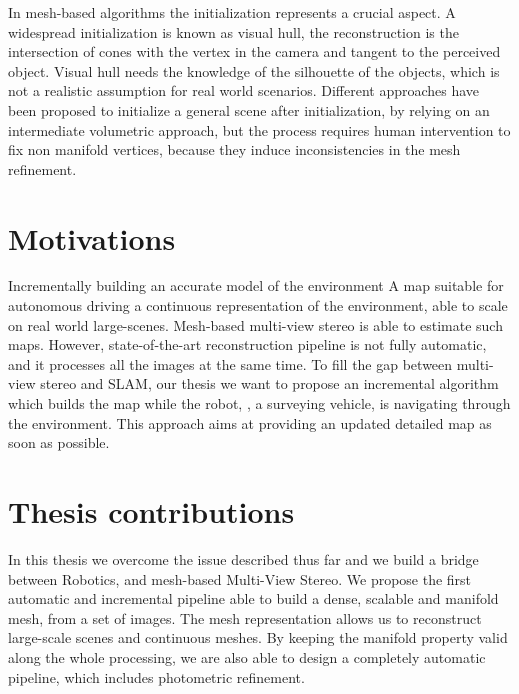 In mesh-based algorithms the initialization represents a crucial aspect.
A widespread initialization is known as visual hull, the reconstruction is the intersection of cones with the vertex in the camera and tangent to the perceived object.
Visual hull needs the knowledge of the silhouette of the objects, which is not a realistic assumption for real world scenarios.
Different approaches have been proposed to initialize a general scene after initialization, by relying on an intermediate volumetric approach, but the process requires human intervention to fix non manifold vertices, because they induce inconsistencies in the mesh refinement.

\section{Motivations}
Incrementally building an accurate model of the environment 
A map suitable for autonomous driving  a continuous representation of the environment, able to scale on real world large-scenes.
Mesh-based multi-view stereo is able to estimate such maps. 
However, state-of-the-art reconstruction pipeline is not fully automatic, and it processes all the images at the same time. 
To fill the gap between multi-view stereo and SLAM, our thesis we want to propose an incremental algorithm which builds the map while the robot, \eg, a surveying vehicle, is navigating through the environment. 
This approach aims at providing an updated detailed map as soon as possible.



\section{Thesis contributions}
In this thesis we overcome the issue described thus far and we build a bridge between Robotics, and mesh-based Multi-View Stereo.
We propose the first automatic and incremental pipeline able to build a dense, scalable and manifold mesh, from a set of images.
The mesh representation allows us  to reconstruct  large-scale scenes and continuous meshes.
By keeping the manifold property valid along the whole processing, we are also able to design a completely automatic pipeline, which includes photometric refinement.

